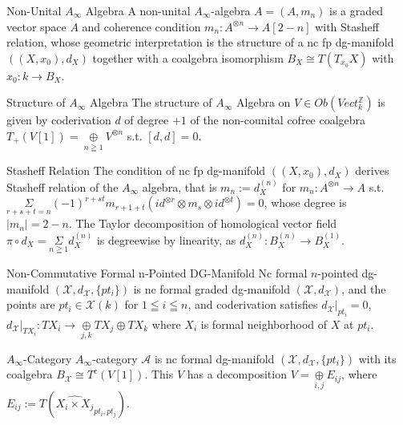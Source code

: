 \documentclass{article}
\begin{document}
\begin{definition}{Non-Unital $A_\infty$ Algebra}{}
A non-unital $A_\infty$-algebra $A=(A,m_n)$ is a graded vector space $A$ and coherence condition $m_n: A^{\otimes n}\to A[2-n]$ 
with Stasheff relation, whose geometric interpretation is the structure of a nc fp dg-manifold $((X, x_0), d_X)$ 
together with a coalgebra isomorphism $B_X\cong T(T_{x_0}X)$ with $x_0:k\to B_X$.
\end{definition}


\begin{definition}{Structure of $A_\infty$ Algebra}{}
The structure of $A_\infty$ Algebra on $V\in Ob(Vect_k^{\mathbb{Z}})$ is given by coderivation $d$ of degree $+1$ 
of the non-counital cofree coalgebra $T_{+}(V[1]) = \underset{n\geqq 1}{\oplus}V^{\otimes n}$ s.t. $[d,d]=0$.
\end{definition}


\begin{proposition}{Stasheff Relation}{}
The condition of nc fp dg-manifold $((X,x_0),d_X)$ derives Stasheff relation of the $A_\infty$ algebra,
that is $m_n:= d_X^{(n)}$ for $m_n: A^{\otimes n}\to A$ s.t.
$\underset{r+s+t=n}{\Sigma} (-1)^{r+st} m_{r+1+t} (id^{\otimes r} \otimes m_s \otimes id^{\otimes t})= 0$, whose degree is  $|m_n|=2-n$.
The Taylor decomposition of homological vector field $\pi\circ d_X = \underset{n\geqq 1}{\Sigma} d_X^{(n)}$ is degreewise by linearity,
as $d_X^{(n)}:B_X^{(n)} \to B_X^{(1)}$.
\end{proposition}


\begin{definition}{Non-Commutative Formal n-Pointed DG-Manifold}{}
Nc formal $n$-pointed dg-manifold $(\mathcal{X}, d_{\mathcal{X}}, \{pt_i\})$ is nc formal graded dg-manifold $(\mathcal{X},d_{\mathcal{X}})$,
and the points are $pt_i \in \mathcal{X} (k)$ for $1 \leqq i \leqq n$, and coderivation satisfies $d_{\mathcal{X}}|_{pt_i}=0$,
$d_{\mathcal{X}}|_{TX_i}: TX_i \to  \underset{j,k}{\oplus} TX_j \oplus TX_k$ where $X_i$ is formal neighborhood of $X$ at $pt_i$.
\end{definition}


\begin{definition}{$A_\infty$-Category}{}
$A_\infty$-category $\mathcal{A}$ is nc formal dg-manifold $(\mathcal{X}, d_{\mathcal{X}}, \{pt_i\})$
with its coalgebra $B_{\mathcal{X}}\cong T^c (V[1])$. This $V$ has a decomposition $V= \underset{i,j}{\oplus} E_{ij}$,
where $E_{ij}:= T(\widehat{X_i \times X_j}_{pt_i,pt_j})$.
\end{definition} 
\end{document}
